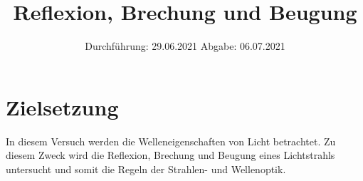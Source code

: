 
\usepackage{parskip}

\subject{V400}
\title{Reflexion, Brechung und Beugung}
\date{
    Durchführung: 29.06.2021
    \hspace{3em}
    Abgabe: 06.07.2021
}



\maketitle
\thispagestyle{empty}
\tableofcontents
\newpage

\section{Zielsetzung}

    In diesem Versuch werden die Welleneigenschaften von Licht betrachtet.
    Zu diesem Zweck wird die Reflexion,
    Brechung und Beugung eines Lichtstrahls untersucht und somit die Regeln der Strahlen- und Wellenoptik.
    

\clearpage


\clearpage

%

%

\printbibliography


